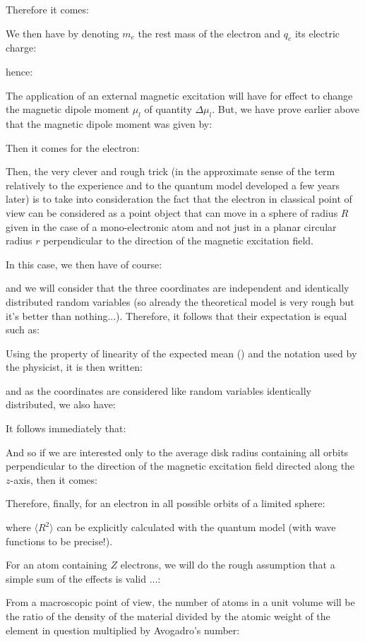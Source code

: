 	Therefore it comes:
	
	We then have by denoting $m_e$ the rest mass of the electron and $q_e$ its electric charge:
	
	hence:
	
	The application of an external magnetic excitation will have for effect to change the magnetic dipole moment $\mu_l$ of quantity $\Delta \mu_l$. But, we have prove earlier above that the magnetic dipole moment was given by:
	
	Then it comes for the electron:
	
	Then, the very clever and rough trick (in the approximate sense of the term relatively to the experience and to the quantum model developed a few years later) is to take into consideration the fact that the electron in classical point of view can be considered as a point object that can move in a sphere of radius $R$ given in the case of a mono-electronic atom and not just in a planar circular radius $r$ perpendicular to the direction of the magnetic excitation field.

	In this case, we then have of course:
	
	and we will consider that the three coordinates are independent and identically distributed random variables (so already the theoretical model is very rough but it's better than nothing...). Therefore, it follows that their expectation is equal such as:
	
	Using the property of linearity of the expected mean () and the notation used by the physicist, it is then written:
	
	and as the coordinates are considered like random variables identically distributed, we also have:
	
	It follows immediately that:
	
	And so if we are interested only to the average  disk radius containing all orbits perpendicular to the direction of the magnetic excitation field directed along the $z$-axis, then it comes:
	
	Therefore, finally, for an electron in all possible orbits of a limited sphere:
	
	where $\langle R^2 \rangle$ can be explicitly calculated with the quantum model (with wave functions to be precise!).

	For an atom containing $Z$ electrons, we will do the rough assumption that a simple sum of the effects is valid ...:
	
	From a macroscopic point of view, the number of atoms in a unit volume will be the ratio of the density of the material divided by the atomic weight of the element in question multiplied by Avogadro's number:
	
